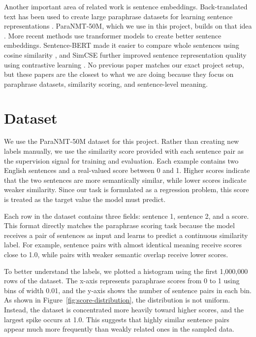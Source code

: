 \documentclass[11pt]{article}
\begin{document}
Another important area of related work is sentence embeddings. Back-translated text has been used to create large paraphrase datasets for learning sentence representations \cite{wieting-etal-2017-learning}. ParaNMT-50M, which we use in this project, builds on that idea \cite{wieting-gimpel-2018-paranmt}. More recent methods use transformer models to create better sentence embeddings. Sentence-BERT made it easier to compare whole sentences using cosine similarity \cite{reimers-gurevych-2019-sentence}, and SimCSE further improved sentence representation quality using contrastive learning \cite{gao-etal-2021-simcse}. No previous paper matches our exact project setup, but these papers are the closest to what we are doing because they focus on paraphrase datasets, similarity scoring, and sentence-level meaning.

\section{Dataset}
We use the ParaNMT-50M dataset for this project. Rather than creating new labels manually, we use the similarity score provided with each sentence pair as the supervision signal for training and evaluation. Each example contains two English sentences and a real-valued score between 0 and 1. Higher scores indicate that the two sentences are more semantically similar, while lower scores indicate weaker similarity. Since our task is formulated as a regression problem, this score is treated as the target value the model must predict.

Each row in the dataset contains three fields: sentence 1, sentence 2, and a score. This format directly matches the paraphrase scoring task because the model receives a pair of sentences as input and learns to predict a continuous similarity label. For example, sentence pairs with almost identical meaning receive scores close to 1.0, while pairs with weaker semantic overlap receive lower scores.

To better understand the labels, we plotted a histogram using the first 1,000,000 rows of the dataset. The x-axis represents paraphrase scores from 0 to 1 using bins of width 0.01, and the y-axis shows the number of sentence pairs in each bin. As shown in Figure~\ref{fig:score-distribution}, the distribution is not uniform. Instead, the dataset is concentrated more heavily toward higher scores, and the largest spike occurs at 1.0. This suggests that highly similar sentence pairs appear much more frequently than weakly related ones in the sampled data.
\end{document}
